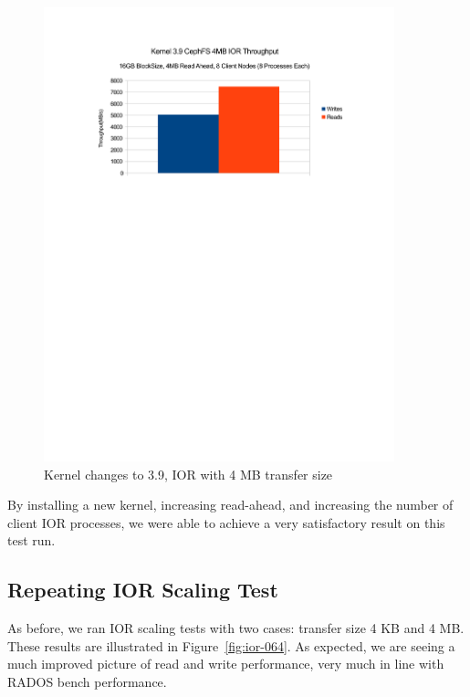 \documentclass{article}
\begin{document}
\begin{figure}[htb]
\centering
\includegraphics[width=4in]{ior-kernel-39}
\caption{Kernel changes to 3.9, IOR with 4 MB transfer size}
\label{fig:ior-kernel-39}
\end{figure}


By installing a new kernel, increasing read-ahead, and increasing the number of
client IOR processes, we were able to achieve a very satisfactory result on this
test run.


\subsection{Repeating IOR Scaling Test}

As before, we ran IOR scaling tests with two cases: transfer size 4 KB and 4 MB.
These results are illustrated in Figure~\ref{fig:ior-064}. As expected, we are
seeing a much improved picture of read and write performance, very much in
line with RADOS bench performance.
\end{document}
